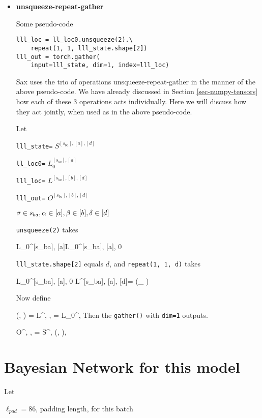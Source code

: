 \begin{itemize}
\item {\bf unsqueeze-repeat-gather}

Some pseudo-code
\begin{mdframed}[hidealllines=true,backgroundcolor=blue!10]
\begin{verbatim}
lll_loc = ll_loc0.unsqueeze(2).\
    repeat(1, 1, lll_state.shape[2])
lll_out = torch.gather(
    input=lll_state, dim=1, index=lll_loc)
\end{verbatim}
\end{mdframed}
Sax uses the trio of operations unsqueeze-repeat-gather
in the manner of the above pseudo-code. We have already 
discussed in Section \ref{sec-numpy-tensors}
how each of these 3 operations
acts individually. Here we will discuss how they
act jointly, when used as in the above
pseudo-code.

Let

{\tt lll\_state=} $S^{[s_{ba}],[a], [d]}$

{\tt ll\_loc0=} $L_0^{[s_{ba}], [a]}$

{\tt lll\_loc=} $L^{[s_{ba}], [b], [d]}$

{\tt lll\_out=} $O^{[s_{ba}], [b], [d]}$

$\sigma\in s_{ba}, \alpha\in[a], \beta\in[b], \delta\in[d]$

{\tt unsqueeze(2)} takes 

\beq
L_0^{[s_{ba}], [a]}\rarrow L_0^{[s_{ba}], [a], 0}
\eeq

{\tt lll\_state.shape[2]} equals $d$, and {\tt repeat(1, 1, d)}
takes

\beq
L_0^{[s_{ba}], [a], 0}\rarrow
L^{[s_{ba}], [a], [d]}= 
(_
{}) 
\eeq

Now define 

\beq
\lam(\s, \alp)
=
L^{\s, \alp, \delta}=
L_0^{\s, \alp}
\eeq 
Then the {\tt gather()} 
with {\tt dim=1} outputs.

\beq 
O^{\s, \alp, \delta}=
S^{\s, \lam(\s, \alp), \delta}
\eeq





\end{itemize}

\section{Bayesian Network for this model}

Let

$\ell_{pad}=86$, padding length, for this batch


